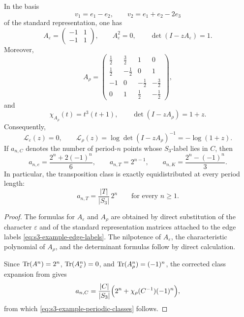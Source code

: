 \begin{proposition}
  \label{prop:s3-example-channels}
  In the basis
  \[
    v_1=e_1-e_2,\qquad v_2=e_1+e_2-2e_3
  \]
  of the standard representation, one has
  \begin{equation}\label{eq:s3-example-aeps}
    A_\varepsilon=
    \begin{pmatrix}
      -1 & 1 \\
      -1 & 1
    \end{pmatrix},
    \qquad
    A_\varepsilon^2=0,
    \qquad
    \det(I-zA_\varepsilon)=1.
  \end{equation}
  Moreover,
  \begin{equation}\label{eq:s3-example-arho}
    A_\rho=
    \begin{pmatrix}
      \frac12 & \frac32 & 1 & 0 \\
      \frac12 & -\frac12 & 0 & 1 \\
      -1 & 0 & -\frac12 & -\frac32 \\
      0 & 1 & \frac12 & -\frac12
    \end{pmatrix},
  \end{equation}
  and
  \begin{equation}\label{eq:s3-example-arho-charpoly}
    \chi_{A_\rho}(t)=t^3(t+1),
    \qquad
    \det(I-zA_\rho)=1+z.
  \end{equation}
  Consequently,
  \begin{equation}\label{eq:s3-example-logarithms}
    \mathcal L_\varepsilon(z)=0,
    \qquad
    \mathcal L_\rho(z)=\log\det(I-zA_\rho)^{-1}=-\log(1+z).
  \end{equation}
  If \(a_{n,C}\) denotes the number of period-\(n\) points whose
  \(S_3\)-label lies in \(C\), then
  \begin{equation}\label{eq:s3-example-periodic-classes}
    a_{n,e}=\frac{2^n+2(-1)^n}{6},
    \qquad
    a_{n,T}=2^{n-1},
    \qquad
    a_{n,K}=\frac{2^n-(-1)^n}{3}.
  \end{equation}
  In particular, the transposition class is exactly equidistributed at
  every period length:
  \begin{equation}\label{eq:s3-example-periodic-equidistribution}
    a_{n,T}=\frac{|T|}{|S_3|}\,2^n
    \qquad \text{for every } n\ge 1.
  \end{equation}
\end{proposition}

\begin{proof}
  The formulas for \(A_\varepsilon\) and \(A_\rho\) are obtained by
  direct substitution of the character \(\varepsilon\) and of the
  standard representation matrices attached to the edge labels
  \eqref{eq:s3-example-edge-labels}. The nilpotence of
  \(A_\varepsilon\), the characteristic polynomial of \(A_\rho\), and
  the determinant formulas follow by direct calculation.

  Since \(\operatorname{Tr}(A^n)=2^n\), \(\operatorname{Tr}(A_\varepsilon^n)=0\), and
  \(\operatorname{Tr}(A_\rho^n)=(-1)^n\), the corrected class expansion from
   gives
  \[
    a_{n,C}
    =
    \frac{|C|}{|S_3|}
      \Bigl(2^n+\chi_\rho(C^{-1})(-1)^n\Bigr),
  \]
  from which \eqref{eq:s3-example-periodic-classes} follows.
\end{proof}

